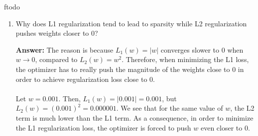 ƒtodo\documentclass{article}
\newenvironment{QandA}{\begin{enumerate}[label=\arabic*.]}{\end{enumerate}}
\newenvironment{ListAlph}{\begin{enumerate}[label=(\alph*)]}{\end{enumerate}}
\newenvironment{answer}{\par\normalfont \textbf{Answer:}}{}
\newcommand{\Exp}[1]{\mathbb{E}\left[ #1 \right]}
\newcommand{\Cov}[1]{\text{Cov}\left[ #1 \right]}
\begin{document}
\begin{QandA}
\begin{answer}
\begin{ListAlph}
            Then, the error becomes:
            \begin{align*}
                \Exp{\left( \frac{1}{K} \sum_{k} \epsilon_k \right)^2} &= \frac{1}{K}v + \frac{K-1}{K}c \\
                &= \frac{1}{K}v + \frac{K-1}{K}v & (c = v) \\
                &= v \\ 
                &= \Exp{\epsilon_k^2}
            \end{align*}
            In other words, we observe no gain wrt. a single model when the errors of the models are correlated.
    
            \item The errors are uncorrelated:
            \begin{align*}
                corr(\epsilon_k, \epsilon_l) &= 0 \\
                \implies \Cov{\epsilon_k, \epsilon_l} &= 0 \\
                \implies c &= 0
            \end{align*}
            In this case, the error becomes:
            \begin{align*}
                \Exp{\left( \frac{1}{K} \sum_{k} \epsilon_k \right)^2} &= \frac{1}{K}v + \frac{K-1}{K}c \\
                &= \frac{1}{K}v  & (c = 0) \\
                &= \frac{\Exp{\epsilon_k^2}}{K}
            \end{align*}
            In contrast to before, we notice a $K$-fold reduction in the error wrt. a single model.
        \end{ListAlph}
        
    \end{answer}
    
    \item Why does L1 regularization tend to lead to sparsity while L2 regularization pushes weights closer to 0?
    \begin{answer}
        The reason is because $L_1(w) = \vert w \vert$ converges slower to $0$ when $w \rightarrow 0$, compared to  $L_2(w)=w^2$. Therefore, when minimizing the L1 loss, the optimizer has to really push the magnitude of the weights close to $0$ in order to achieve regularization loss close to $0$. \\\\
        Let $w = 0.001$. Then, $L_1(w) = \vert 0.001 \vert = 0.001$, but $L_2(w) = (0.001)^2 = 0.000001$. We see that for the same value of $w$, the L2 term is much lower than the L1 term. As a consequence, in order to minimize the L1 regularization loss, the optimizer is forced to push $w$ even closer to $0$.
    \end{answer}
    

\end{QandA}
\end{document}
